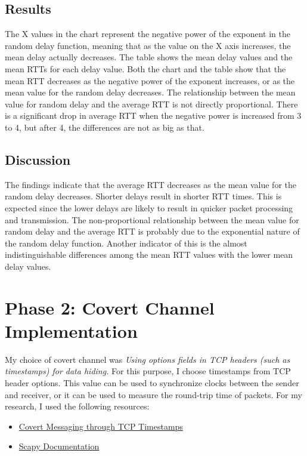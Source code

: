 \documentclass[10pt,a4paper]{article}
\begin{document}
\subsection*{Results}

The X values in the chart represent the negative power of the exponent in the random delay function,
meaning that as the value on the X axis increases, the mean delay actually decreases.
The table shows the mean delay values and the mean RTTs for each delay value.
Both the chart and the table show that the mean RTT decreases as the negative power of the exponent increases, or as the mean value for the random delay decreases.
The relationship between the mean value for random delay and the average RTT is not directly proportional.
There is a significant drop in average RTT when the negative power is increased from 3 to 4, but after 4, the differences are not as big as that.


\subsection*{Discussion}
The findings indicate that the average RTT decreases as the mean value for the random delay decreases.
Shorter delays result in shorter RTT times.
This is expected since the lower delays are likely to result in quicker packet processing and transmission.
The non-proportional relationship between the mean value for random delay and the average RTT is probably due to the exponential nature of the random delay function.
Another indicator of this is the almost indistinguishable differences among the mean RTT values with the lower mean delay values.

\section*{Phase 2: Covert Channel Implementation}
My choice of covert channel was \textit{Using options fields in TCP headers (such as timestamps) for data hiding.} 
For this purpose, I choose timestamps from TCP header options. 
This value can be used to synchronize clocks between the sender and receiver, or it can be used to measure the round-trip time of packets.
For my research, I used the following resources:
\begin{itemize}
    \item \href{https://web.mit.edu/greenie/Public/petspaper.pdf}{Covert Messaging through TCP Timestamps}
    \item \href{https://scapy.readthedocs.io/en/latest/}{Scapy Documentation}
\end{itemize}
\end{document}
